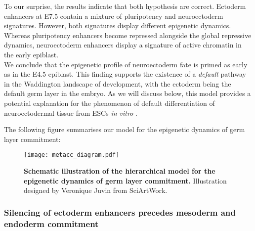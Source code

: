 To our surprise, the results indicate that both hypothesis are correct. Ectoderm enhancers at E7.5 contain a mixture of pluripotency and neuroectoderm signatures. However, both signatures display different epigenetic dynamics. Whereas pluripotency enhancers become repressed alongside the global repressive dynamics, neuroectoderm enhancers display a signature of active chromatin in the early epiblast.\\
We conclude that the epigenetic profile of neuroectoderm fate is primed as early as in the E4.5 epiblast. This finding supports the existence of a \textit{default} pathway in the
Waddington landscape of development, with the ectoderm being the default germ layer in the embryo. As we will discuss below, this model provides a potential explanation for the phenomenon of default differentiation of neuroectodermal tissue from ESCs \textit{in vitro} \cite{Munoz2002,Hemmati-Brivanlou1997}.

The following figure summarises our model for the epigenetic dynamics of germ layer commitment:

\begin{figure}[H]
	\centering
	\texttt{[image: metacc\_diagram.pdf]}
	\caption{
	\textbf{Schematic illustration of the hierarchical model for the epigenetic dynamics of germ layer commitment.} Illustration designed by Veronique Juvin from SciArtWork. }
	\label{fig:metacc_diagram}
\end{figure}


\subsubsection{Silencing of ectoderm enhancers precedes mesoderm and endoderm commitment}

